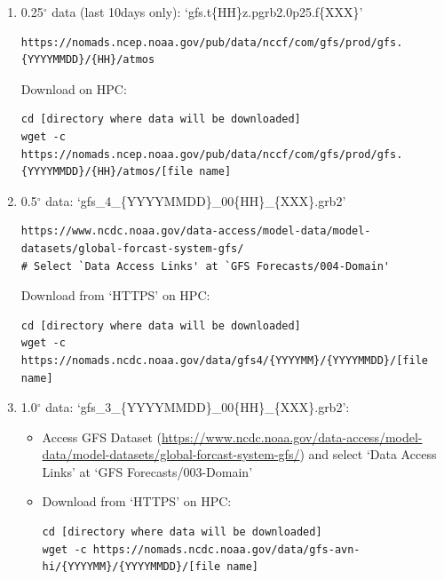 \documentclass[11pt,fleqn]{report}              %
\begin{document}
\begin{enumerate}
\item 0.25$^{\circ}$ data (last 10days only):  `gfs.t\{HH\}z.pgrb2.0p25.f\{XXX\}'
\lstset{language=bash}   
\begin{lstlisting}[frame=trBL]
https://nomads.ncep.noaa.gov/pub/data/nccf/com/gfs/prod/gfs.{YYYYMMDD}/{HH}/atmos
\end{lstlisting}

Download on HPC:
\lstset{language=bash}   
\begin{lstlisting}[frame=trBL]
cd [directory where data will be downloaded]
wget -c https://nomads.ncep.noaa.gov/pub/data/nccf/com/gfs/prod/gfs.{YYYYMMDD}/{HH}/atmos/[file name]
\end{lstlisting}

\item 0.5$^{\circ}$ data: `gfs\_4\_\{YYYYMMDD\}\_00\{HH\}\_\{XXX\}.grb2'
\lstset{language=bash}   
\begin{lstlisting}[frame=trBL]
https://www.ncdc.noaa.gov/data-access/model-data/model-datasets/global-forcast-system-gfs/
# Select `Data Access Links' at `GFS Forecasts/004-Domain'
\end{lstlisting}

Download from `HTTPS' on HPC:
\lstset{language=bash}   
\begin{lstlisting}[frame=trBL]
cd [directory where data will be downloaded]
wget -c https://nomads.ncdc.noaa.gov/data/gfs4/{YYYYMM}/{YYYYMMDD}/[file name]
\end{lstlisting}


\item 1.0$^{\circ}$ data: `gfs\_3\_\{YYYYMMDD\}\_00\{HH\}\_\{XXX\}.grb2':
\begin{itemize}
\item Access GFS Dataset (\url{https://www.ncdc.noaa.gov/data-access/model-data/model-datasets/global-forcast-system-gfs/}) and select `Data Access Links' at `GFS Forecasts/003-Domain'

\item Download from `HTTPS' on HPC:
\lstset{language=bash}   
\begin{lstlisting}[frame=trBL]
cd [directory where data will be downloaded]
wget -c https://nomads.ncdc.noaa.gov/data/gfs-avn-hi/{YYYYMM}/{YYYYMMDD}/[file name]
\end{lstlisting}
\end{itemize}

\end{enumerate}
\end{document}

